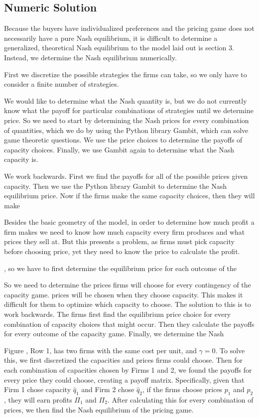 \documentclass[11pt]{article}
\begin{document}
\subsection{Numeric Solution}
Because the buyers have individualized preferences and the pricing game does
not necessarily have a pure Nash equilibrium, it is difficult to determine a
generalized, theoretical Nash equilibrium to the model laid out is section 3.
Instead, we determine the Nash equilibrium numerically.

First we discretize the possible strategies the firms can take, so we only have
to consider a finite number of strategies.

We would like to determine what the Nash quantity is, but we do not currently
know what the payoff for particular combinations of strategies until we
determine price. So we need to start by determining the Nash prices for every
combination of quantities, which we do by using the Python library Gambit,
which can solve game theoretic questions. We use the price choices to determine
the payoffs of capacity choices. Finally, we use Gambit again to determine what
the Nash capacity is.

We work backwards. First we find the payoffs for all of the possible prices
given capacity. Then we use the Python library Gambit to determine the Nash
equilibrium price. Now if the firms make the same capacity choices, then they
will make

Besides the basic geometry of the model, in order to determine how much profit
a firm makes we need to know how much capacity every firm produces and what
prices they sell at. But this presents a problem, as firms must pick capacity
before choosing price, yet they need to know the price to calculate the profit.

, so we have to first determine the equilibrium price for
each outcome of the 

So we need to determine the prices firms will choose for
every contingency of the capacity game.
prices will be chosen when they choose capacity. This makes it difficult for
them to optimize which capacity to choose. The solution to this is to work
backwards. The firms first find the equilibrium price choice for every
combination of capacity choices that might occur. Then they calculate the
payoffs for every outcome of the capacity game. Finally, we determine the Nash 

Figure \pageref{fig:fig3x2SingleTimestep}, Row 1, has two firms with the same
cost per unit, and $\gamma=0$. To solve this, we first discretized the
capacities and prices firms could choose. Then for each combination of
capacities chosen by Firms 1 and 2, we found the payoffs for every price they
could choose, creating a payoff matrix. Specifically, given that Firm 1 chose
capacity $\hat q_1$ and Firm 2 chose $\hat q_2$, if the firms choose prices
$p_1$ and $p_2$, they will earn profits $\Pi_1$ and $\Pi_2$. After calculating
this for every combination of prices, we then find the Nash equilibrium of the
pricing game. 
\end{document}
